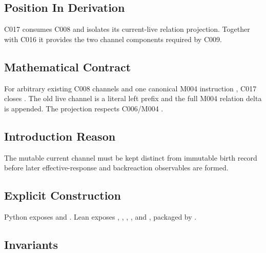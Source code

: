 \subsection{Position In Derivation}\label{position-in-derivation-25}

C017 consumes C008 and isolates its current-live relation projection.
Together with C016 it provides the two channel components required by
C009.

\subsection{Mathematical Contract}\label{mathematical-contract-12}

For arbitrary existing C008 channels and one canonical M004 instruction
\texttt{\protect{}}, C017 closes
\texttt{\protect{}}.
The old live channel is a literal left prefix and the full M004 relation
delta is appended. The projection respects C006/M004 \texttt{\protect{}}.

\subsection{Introduction Reason}\label{introduction-reason-28}

The mutable current channel must be kept distinct from immutable birth
record before later effective-response and backreaction observables are
formed.

\subsection{Explicit Construction}\label{explicit-construction-12}

Python exposes \texttt{\protect{}} and
\texttt{\protect{}}. Lean exposes
\texttt{\protect{}}, \texttt{\protect{}},
\texttt{\protect{}},
\texttt{\protect{}}, and
\texttt{\protect{}}, packaged by
\texttt{\protect{}}.

\subsection{Invariants}\label{invariants-12}

